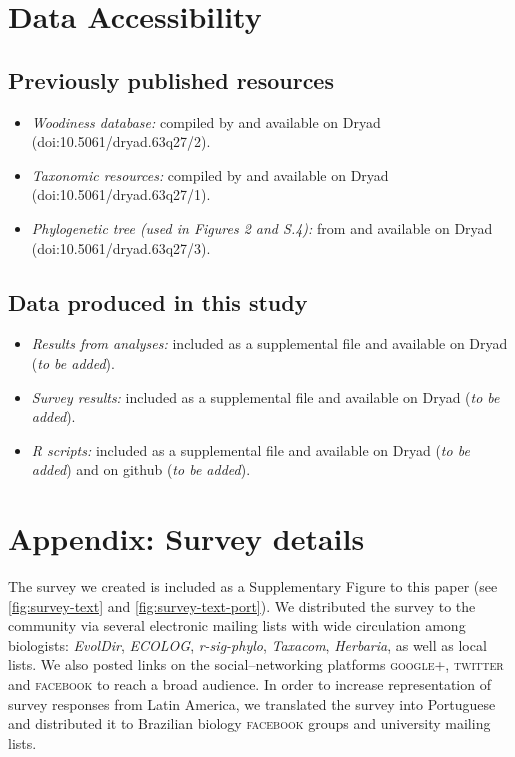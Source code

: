 \documentclass[a4paper,12pt]{article}
\begin{document}
\section{Data Accessibility}
\subsection{Previously published resources}
\begin{itemize}
\item \textit{Woodiness database:} compiled by \citet{Zanne} and available on
Dryad (doi:10.5061/dryad.63q27/2).
\item \textit{Taxonomic resources:} compiled by \citet{Zanne} and available on
Dryad (doi:10.5061/dryad.63q27/1).
\item \textit{Phylogenetic tree (used in Figures 2 and S.4):} from \citet{Zanne} and
available on Dryad (doi:10.5061/dryad.63q27/3).
\end{itemize}

\subsection{Data produced in this study}
\begin{itemize}
\item \textit{Results from analyses:} included as a supplemental file and available
on Dryad (\textit{to be added}).
\item \textit{Survey results:} included as a supplemental file and available
on Dryad (\textit{to be added}).
\item \textit{R scripts:} included as a supplemental file and available on
Dryad (\textit{to be added}) and on github (\textit{to be added}).
\end{itemize}


\section{Appendix: Survey details}
%
The survey we created is included as a Supplementary Figure to
this paper (see \ref{fig:survey-text} and \ref{fig:survey-text-port}).
We distributed the survey to the 
community via several electronic
mailing lists with wide circulation among biologists: \emph{EvolDir},
\emph{ECOLOG}, \emph{\mbox{r-sig-phylo}}, \emph{Taxacom},
\emph{Herbaria}, as well as local lists. We also posted links on the
social--networking platforms \textsc{google+}, \textsc{twitter} and
\textsc{facebook} to reach a broad audience.
%
In order to increase representation of survey responses from Latin
America, we translated the survey into Portuguese and distributed it
to Brazilian biology \textsc{facebook} groups and university mailing
lists.
\end{document}
